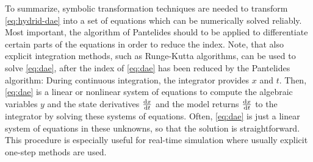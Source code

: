 To summarize, symbolic transformation techniques are needed to transform \eqref{eq:hydrid-dae} into a set of equations which can be numerically solved reliably.
Most important, the algorithm of Pantelides should to be applied to differentiate certain parts of the equations in order to reduce the index.
Note, that also explicit integration methods, such as Runge-Kutta algorithms, can be used to solve \eqref{eq:dae}, after the index of \eqref{eq:dae} has been reduced by the Pantelides algorithm: During continuous integration, the integrator provides $x$ and $t$.
Then, \eqref{eq:dae} is a linear or nonlinear system of equations to compute the algebraic variables $y$ and the state derivatives $\udfrac{x}{t}$ and the model returns $\udfrac{x}{t}$ to the integrator by solving these systems of equations.
Often, \eqref{eq:dae} is just a linear system of equations in these unknowns, so that the solution is straightforward.
This procedure is especially useful for real-time simulation where usually explicit one-step methods are used.
